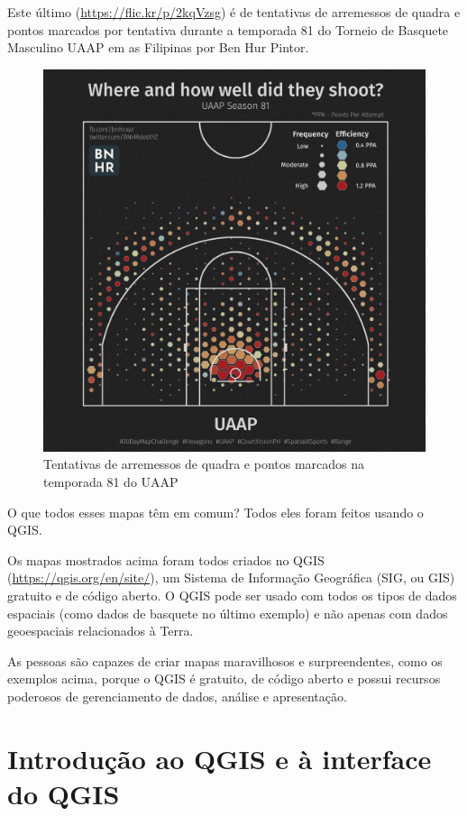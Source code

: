 \documentclass[
]{krantz}
\begin{document}
Este último (\href{https://flic.kr/p/v2kqVzsg}{https://flic.kr/p/2kqVzsg}) é de tentativas de arremessos de quadra e pontos marcados por tentativa durante a temporada 81 do Torneio de Basquete Masculino UAAP em as Filipinas por Ben Hur Pintor.

\begin{figure}
\centering
\includegraphics{media/modulo1/sample-4.jpg}
\caption{Tentativas de arremessos de quadra e pontos marcados na temporada 81 do UAAP}
\end{figure}

O que todos esses mapas têm em comum? Todos eles foram feitos usando o QGIS.

Os mapas mostrados acima foram todos criados no QGIS (\url{https://qgis.org/en/site/}), um Sistema de Informação Geográfica (SIG, ou GIS) gratuito e de código aberto. O QGIS pode ser usado com todos os tipos de dados espaciais (como dados de basquete no último exemplo) e não apenas com dados geoespaciais relacionados à Terra.

As pessoas são capazes de criar mapas maravilhosos e surpreendentes, como os exemplos acima, porque o QGIS é gratuito, de código aberto e possui recursos poderosos de gerenciamento de dados, análise e apresentação.

\hypertarget{introduuxe7uxe3o-ao-qgis-e-uxe0-interface-do-qgis}{%
\section{Introdução ao QGIS e à interface do QGIS}\label{introduuxe7uxe3o-ao-qgis-e-uxe0-interface-do-qgis}}
\end{document}
